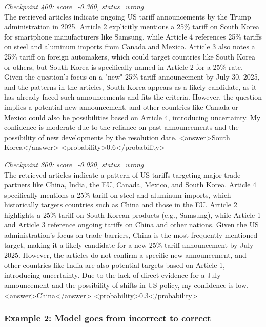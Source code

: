 \noindent\textit{Checkpoint 400: score=-0.360, status=wrong}\\
The retrieved articles indicate ongoing US tariff announcements by the Trump administration in 2025. Article 2 explicitly mentions a 25\% tariff on South Korea for smartphone manufacturers like Samsung, while Article 4 references 25\% tariffs on steel and aluminum imports from Canada and Mexico. Article 3 also notes a 25\% tariff on foreign automakers, which could target countries like South Korea or others, but South Korea is specifically named in Article 2 for a 25\% rate. Given the question's focus on a "new" 25\% tariff announcement by July 30, 2025, and the patterns in the articles, South Korea appears as a likely candidate, as it has already faced such announcements and fits the criteria. However, the question implies a potential new announcement, and other countries like Canada or Mexico could also be possibilities based on Article 4, introducing uncertainty. My confidence is moderate due to the reliance on past announcements and the possibility of new developments by the resolution date. <answer>South Korea</answer> <probability>0.6</probability>

\medskip

\noindent\textit{Checkpoint 800: score=-0.090, status=wrong}\\
The retrieved articles indicate a pattern of US tariffs targeting major trade partners like China, India, the EU, Canada, Mexico, and South Korea. Article 4 specifically mentions a 25\% tariff on steel and aluminum imports, which historically targets countries such as China and those in the EU. Article 2 highlights a 25\% tariff on South Korean products (e.g., Samsung), while Article 1 and Article 3 reference ongoing tariffs on China and other nations. Given the US administration's focus on trade barriers, China is the most frequently mentioned target, making it a likely candidate for a new 25\% tariff announcement by July 2025. However, the articles do not confirm a specific new announcement, and other countries like India are also potential targets based on Article 1, introducing uncertainty. Due to the lack of direct evidence for a July announcement and the possibility of shifts in US policy, my confidence is low. <answer>China</answer> <probability>0.3</probability>

\subsubsection{Example 2: Model goes from incorrect to correct}

